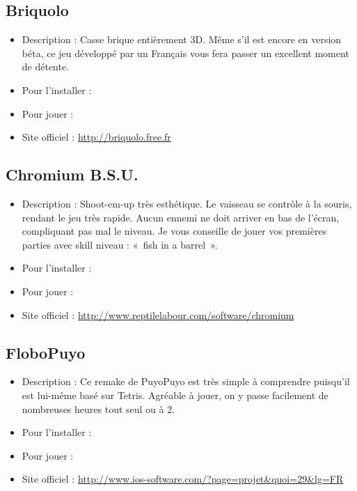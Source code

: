 \subsection{Briquolo}
\begin{itemize}
\begingroup
{}
\item Description : Casse brique entièrement 3D. Même s'il est encore en version béta, ce jeu développé par un Français vous fera passer un excellent moment de détente.{\par}
\item Pour l'installer : 
\item Pour jouer : 
\item Site officiel : \url{http://briquolo.free.fr}{\par}
\endgroup
\end{itemize}
\subsection{Chromium B.S.U.}
\begin{itemize}
\begingroup
{}
\item Description : Shoot-em-up très esthétique. Le vaisseau se contrôle à la souris, rendant le jeu très rapide. Aucun ennemi ne doit arriver en bas de l'écran, compliquant pas mal le niveau. Je vous conseille de jouer vos premières parties avec skill niveau : «~fish in a barrel~». {\par}
\endgroup
\item Pour l'installer : 
\item Pour jouer : 
\item Site officiel : \url{http://www.reptilelabour.com/software/chromium}{\par}
\end{itemize}
\subsection{FloboPuyo}
\begin{itemize}
\begingroup
{}
\item Description : Ce remake de PuyoPuyo est très simple à comprendre puisqu'il est lui-même basé sur Tetris. Agréable à jouer, on y passe facilement de nombreuses heures tout seul ou à 2.{\par}
\endgroup
\item Pour l'installer : 
\item Pour jouer : 
\item Site officiel : \url{http://www.ios-software.com/?page=projet&quoi=29&lg=FR}{\par}
\end{itemize}

